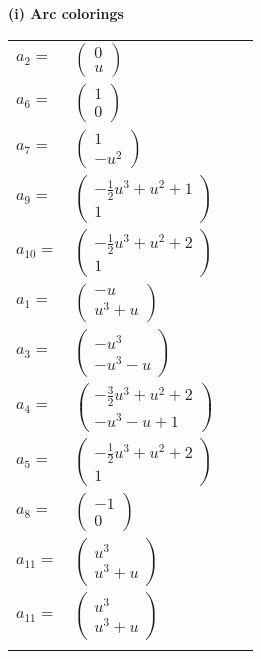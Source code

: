 \documentclass[1p]{elsarticle_modified}
\theoremstyle{definition}
\begin{document}
\flushleft \textbf{(i) Arc colorings}\\
\begin{tabular}{m{7pt} m{180pt} m{7pt} m{180pt} }
\flushright $a_{2}=$&$\begin{pmatrix}0\\u\end{pmatrix}$ \\
\flushright $a_{6}=$&$\begin{pmatrix}1\\0\end{pmatrix}$ \\
\flushright $a_{7}=$&$\begin{pmatrix}1\\- u^2\end{pmatrix}$ \\
\flushright $a_{9}=$&$\begin{pmatrix}-\frac{1}{2} u^3+u^2+1\\1\end{pmatrix}$ \\
\flushright $a_{10}=$&$\begin{pmatrix}-\frac{1}{2} u^3+u^2+2\\1\end{pmatrix}$ \\
\flushright $a_{1}=$&$\begin{pmatrix}- u\\u^3+u\end{pmatrix}$ \\
\flushright $a_{3}=$&$\begin{pmatrix}- u^3\\- u^3- u\end{pmatrix}$ \\
\flushright $a_{4}=$&$\begin{pmatrix}-\frac{3}{2} u^3+u^2+2\\- u^3- u+1\end{pmatrix}$ \\
\flushright $a_{5}=$&$\begin{pmatrix}-\frac{1}{2} u^3+u^2+2\\1\end{pmatrix}$ \\
\flushright $a_{8}=$&$\begin{pmatrix}-1\\0\end{pmatrix}$ \\
\flushright $a_{11}=$&$\begin{pmatrix}u^3\\u^3+u\end{pmatrix}$\\ \flushright $a_{11}=$&$\begin{pmatrix}u^3\\u^3+u\end{pmatrix}$\\&\end{tabular}
\end{document}
